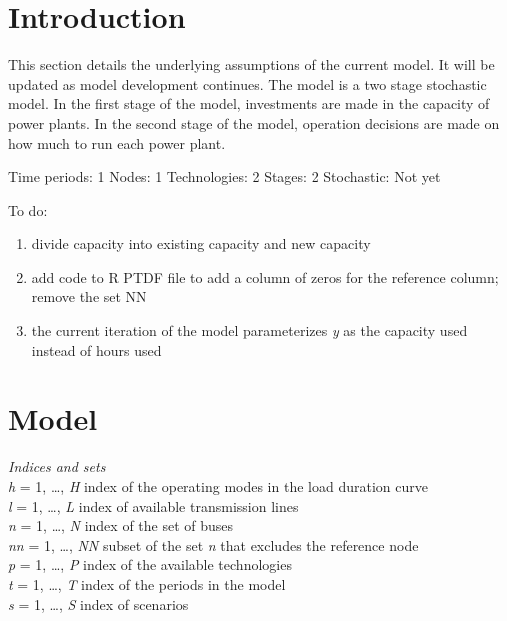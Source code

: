\documentclass[10pt]{amsart}
\begin{document}
\section{Introduction}
This section details the underlying assumptions of the current model. 
It will be updated as model development continues.
The model is a two stage stochastic model.
In the first stage of the model, investments are made in the capacity of power plants.
In the second stage of the model, operation decisions are made on how much to run each power plant. 

Time periods: 1
Nodes: 1
Technologies: 2
Stages: 2
Stochastic: Not yet

To do:
\begin{enumerate}
\item divide capacity into existing capacity and new capacity
\item add code to R PTDF file to add a column of zeros for the reference column; remove the set NN 
\item the current iteration of the model parameterizes \textit{y} as the capacity used instead of hours used
\end{enumerate}

\section{Model}
\begin{flushleft}
\textit{Indices and sets}\\
\textit{h} = 1, \ldots, \textit{H} index of the operating modes in the load duration curve \\
\textit{l} = 1, \ldots, \textit{L} index of available transmission lines \\
\textit{n} = 1, \ldots, \textit{N} index of the set of buses \\
\textit{nn} = 1, \ldots, \textit{NN} subset of the set \textit{n} that excludes the reference node \\ 
\textit{p} = 1, \ldots, \textit{P} index of the available technologies \\ 
\textit{t} = 1, \ldots, \textit{T} index of the periods in the model \\
\textit{s} = 1, \ldots, \textit{S} index of scenarios \\
\end{flushleft}
\end{document}
